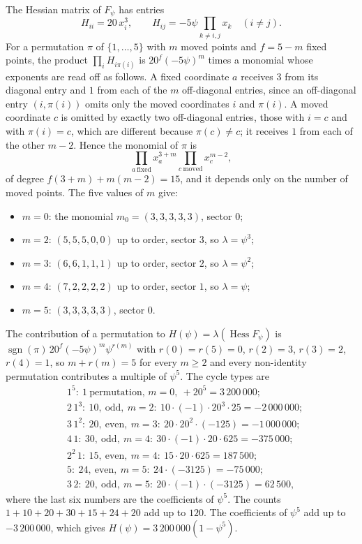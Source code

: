 \documentclass[11pt]{amsart}
\theoremstyle{definition}
\theoremstyle{remark}
\newcommand{\Hess}{\operatorname{Hess}}
\begin{document}
The Hessian matrix of $F_\psi$ has entries
\[
H_{ii}=20\,x_i^3,\qquad H_{ij}=-5\psi\prod_{k\ne i,j}x_k\quad(i\ne j).
\]
For a permutation $\pi$ of $\{1,\dots,5\}$ with $m$ moved points and
$f=5-m$ fixed points, the product $\prod_iH_{i\pi(i)}$ is
$20^f(-5\psi)^m$ times a monomial whose exponents are read off as follows.
A fixed coordinate $a$ receives $3$ from its diagonal entry and $1$ from each
of the $m$ off-diagonal entries, since an off-diagonal entry $(i,\pi(i))$
omits only the moved coordinates $i$ and $\pi(i)$. A moved coordinate $c$
is omitted by exactly two off-diagonal entries, those with $i=c$ and with
$\pi(i)=c$, which are different because $\pi(c)\ne c$; it receives $1$ from
each of the other $m-2$. Hence the monomial of $\pi$ is
\[
\prod_{a\ \mathrm{fixed}}x_a^{3+m}\prod_{c\ \mathrm{moved}}x_c^{m-2},
\]
of degree $f(3+m)+m(m-2)=15$, and it depends only on the number of moved
points. The five values of $m$ give:
\begin{itemize}[leftmargin=*,itemsep=1pt]
\item $m=0$: the monomial $m_0=(3,3,3,3,3)$, sector $0$;
\item $m=2$: $(5,5,5,0,0)$ up to order, sector $3$, so $\lambda=\psi^3$;
\item $m=3$: $(6,6,1,1,1)$ up to order, sector $2$, so $\lambda=\psi^2$;
\item $m=4$: $(7,2,2,2,2)$ up to order, sector $1$, so $\lambda=\psi$;
\item $m=5$: $(3,3,3,3,3)$, sector $0$.
\end{itemize}
The contribution of a permutation to $H(\psi)=\lambda(\Hess F_\psi)$ is
$\operatorname{sgn}(\pi)\,20^f(-5\psi)^m\psi^{r(m)}$ with $r(0)=r(5)=0$,
$r(2)=3$, $r(3)=2$, $r(4)=1$, so $m+r(m)=5$ for every $m\ge2$ and every
non-identity permutation contributes a multiple of $\psi^5$. The cycle
types are
\[
\begin{aligned}
&1^5:\ 1\ \text{permutation, }m=0,\ +20^5=3\,200\,000;\\
&2\,1^3:\ 10,\ \text{odd},\ m=2:\ 10\cdot(-1)\cdot20^3\cdot25=-2\,000\,000;\\
&3\,1^2:\ 20,\ \text{even},\ m=3:\ 20\cdot20^2\cdot(-125)=-1\,000\,000;\\
&4\,1:\ 30,\ \text{odd},\ m=4:\ 30\cdot(-1)\cdot20\cdot625=-375\,000;\\
&2^2\,1:\ 15,\ \text{even},\ m=4:\ 15\cdot20\cdot625=187\,500;\\
&5:\ 24,\ \text{even},\ m=5:\ 24\cdot(-3125)=-75\,000;\\
&3\,2:\ 20,\ \text{odd},\ m=5:\ 20\cdot(-1)\cdot(-3125)=62\,500,
\end{aligned}
\]
where the last six numbers are the coefficients of $\psi^5$. The counts
$1+10+20+30+15+24+20$ add up to $120$. The coefficients of $\psi^5$ add up
to $-3\,200\,000$, which gives $H(\psi)=3\,200\,000(1-\psi^5)$.
\end{document}
